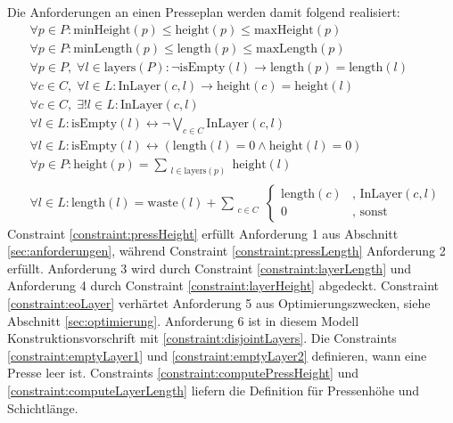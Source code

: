 Die Anforderungen an einen Presseplan werden damit folgend realisiert:
\begin{align}
    & \forall p \in P: \text{minHeight}(p) \leq \text{height}(p) \leq \text{maxHeight}(p) \label{constraint:pressHeight} \\[10pt]
    & \forall p \in P: \text{minLength}(p) \leq \text{length}(p) \leq \text{maxLength}(p) \label{constraint:pressLength} \\[10pt]
    & \forall p \in P,\; \forall l \in \text{layers}(P): \neg \text{isEmpty}(l) \rightarrow \text{length}(p) = \text{length}(l) \label{constraint:layerLength} \\[10pt]
    & \forall c \in C,\; \forall l \in L: \text{InLayer}(c,l) \rightarrow \text{height}(c) = \text{height}(l) \label{constraint:layerHeight} \\[10pt]
    & \forall c \in C,\; \exists! l \in L: \text{InLayer}(c,l) \label{constraint:eoLayer} \\[10pt]
    & \forall l \in L: \text{isEmpty}(l) \leftrightarrow \neg\bigvee_{c \in C} \text{InLayer}(c,l) \label{constraint:emptyLayer1} \\[10pt]
    & \forall l \in L: \text{isEmpty}(l) \leftrightarrow (\text{length}(l) = 0 \land \text{height}(l) = 0) \label{constraint:emptyLayer2} \\[10pt]
    & \forall p \in P: \text{height}(p) = \sum_{\substack{l \in \text{layers}(p)}} \text{height}(l) \label{constraint:computePressHeight} \\[10pt]
    & \forall l \in L: \text{length}(l) = \text{waste}(l) + \sum_{\substack{c \in C}}
    \begin{cases}
        \text{length}(c) & \text{, } \text{InLayer}(c,l) \\
        0 & \text{, sonst}
    \end{cases} \label{constraint:computeLayerLength}
\end{align}
Constraint \ref{constraint:pressHeight} erfüllt Anforderung 1 aus Abschnitt \ref{sec:anforderungen}, während Constraint \ref{constraint:pressLength} Anforderung 2 erfüllt.
Anforderung 3 wird durch Constraint \ref{constraint:layerLength} und Anforderung 4 durch Constraint \ref{constraint:layerHeight} abgedeckt.
Constraint \ref{constraint:eoLayer} verhärtet Anforderung 5 aus Optimierungszwecken, siehe Abschnitt \ref{sec:optimierung}.
Anforderung 6 ist in diesem Modell Konstruktionsvorschrift mit \ref{constraint:disjointLayers}.
Die Constraints \ref{constraint:emptyLayer1} und \ref{constraint:emptyLayer2} definieren, wann eine Presse leer ist.
Constraints \ref{constraint:computePressHeight} und \ref{constraint:computeLayerLength} liefern die Definition für Pressenhöhe und Schichtlänge.

